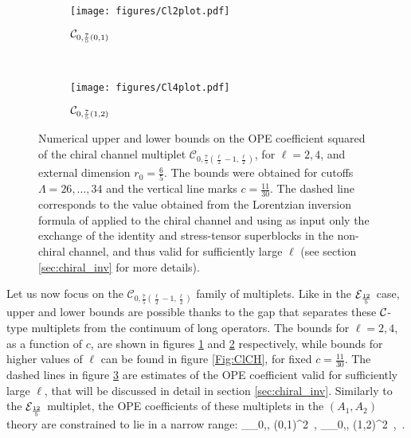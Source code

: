 \begin{figure}[htbp!]
\begin{center}      
	\begin{subfigure}[t]{0.5\textwidth}
	\centering        
	\texttt{[image: figures/Cl2plot.pdf]}
	\caption{${\mathcal{C}}_{0,\frac75(0,1)}$}
    \label{Fig:Cl2}
    \end{subfigure}~
    \begin{subfigure}[t]{0.5\textwidth}
    \centering        
    \texttt{[image: figures/Cl4plot.pdf]}
    \caption{${\mathcal{C}}_{0,\frac75(1,2)}$}
    \label{Fig:Cl4}
    \end{subfigure}
\end{center}
\caption{Numerical upper and lower bounds on the OPE coefficient squared of the chiral channel multiplet $\mathcal{C}_{0,\frac75\left(\frac{\ell }{2}-1,\frac{\ell }{2}\right)}$, for $\ell=2,4$, and external dimension $r_0=\frac65$. The bounds were obtained for cutoffs $\Lambda=26,\ldots,34$ and the vertical line marks $c=\tfrac{11}{30}$. The dashed line corresponds to the value obtained from the Lorentzian inversion formula of \cite{Caron-Huot:2017vep} applied to the chiral channel and using as input only the exchange of the identity and stress-tensor superblocks in the non-chiral channel, and thus valid for sufficiently large $\ell$ (see section \ref{sec:chiral_inv} for more details).}
\label{Fig:Cl24}
\end{figure}

Let us now focus on the $\mathcal{C}_{0,\frac75\left(\frac{\ell }{2}-1,\frac{\ell }{2}\right)}$ family of multiplets. Like in the ${\mathcal{E}}_{\frac{12}5}$ case, upper and lower bounds are possible thanks to the gap that separates these ${\mathcal{C}}$-type multiplets from the continuum of long operators. The bounds for $\ell=2,4$,  as a function of $c$, are shown in figures \ref{Fig:Cl2} and \ref{Fig:Cl4} respectively, while bounds for higher values of $\ell$ can be found in figure \ref{Fig:ClCH}, for fixed $c=\tfrac{11}{30}$.
The dashed lines in figure \ref{Fig:Cl24} are estimates of the OPE coefficient valid for sufficiently large $\ell$, that will be discussed in detail in section \ref{sec:chiral_inv}.
Similarly to the ${\mathcal{E}}_{\frac{12}5}$ multiplet, the OPE coefficients of these multiplets in  the $(A_1,A_2)$ theory are constrained to lie in a narrow range:
 \leqslant \lambda_{\CC_{0,, (0,1)}}^2  \,,  \leqslant \lambda_{\CC_{0,, (1,2)}}^2  \,,  \qquad
 \; \,.
 \label{eq:Clbound}
\ee


